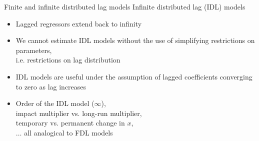 \documentclass{beamer}
\begin{document}
\begin{frame}{Finite and infinite distributed lag models}
Infinite distributed lag (IDL) models\\ \medskip
\begin{itemize}
\item Lagged regressors extend back to infinity
\item We cannot estimate IDL models without the use of simplifying restrictions on parameters, \\i.e. restrictions on lag distribution
\smallskip
\item IDL models are useful under the assumption of lagged coefficients converging to zero as lag increases
\smallskip
\item Order of the IDL model ($\infty$), 
\\impact multiplier vs. long-run multiplier, 
\\temporary vs. permanent change in $x$,
\\ $\dots$ all analogical to FDL models
\end{itemize}
\end{frame}
\end{document}
